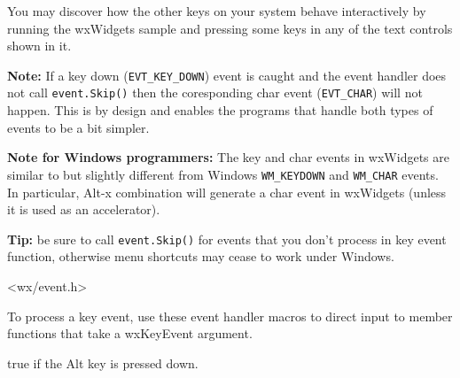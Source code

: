 You may discover how the other keys on your system behave interactively by
running the  wxWidgets sample and pressing some keys
in any of the text controls shown in it.

{\bf Note:} If a key down ({\tt EVT\_KEY\_DOWN}) event is caught and
the event handler does not call {\tt event.Skip()} then the coresponding
char event ({\tt EVT\_CHAR}) will not happen.  This is by design and
enables the programs that handle both types of events to be a bit
simpler.

{\bf Note for Windows programmers:} The key and char events in wxWidgets are
similar to but slightly different from Windows {\tt WM\_KEYDOWN} and
{\tt WM\_CHAR} events. In particular, Alt-x combination will generate a char
event in wxWidgets (unless it is used as an accelerator).

{\bf Tip:} be sure to call {\tt event.Skip()} for events that you don't process in
key event function, otherwise menu shortcuts may cease to work under Windows.




<wx/event.h>


To process a key event, use these event handler macros to direct input to member
functions that take a wxKeyEvent argument.

\twocolwidtha{7cm}
\begin{twocollist}\itemsep=0pt
\end{twocollist}%




\label{wxkeyeventmaltdown}


true if the Alt key is pressed down.


\label{wxkeyeventmcontroldown}


